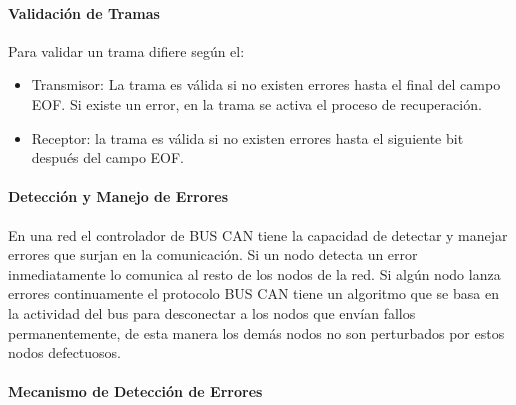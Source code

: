 \paragraph{Validación de Tramas}

Para validar un trama difiere según el:

\begin {itemize}
\item Transmisor: La trama es válida si no existen errores hasta el final del campo EOF. Si existe un error, en la trama se activa el proceso de recuperación.
\item Receptor: la trama es válida si no existen errores hasta el siguiente bit después del campo EOF.
\end{itemize}


\paragraph{Detección y Manejo de Errores}

En una red el controlador de BUS CAN tiene la capacidad de detectar y manejar errores que surjan en la comunicación. Si un nodo detecta un error inmediatamente lo comunica al resto de  los nodos de la red. Si algún nodo lanza errores continuamente el protocolo BUS CAN tiene un algoritmo que se basa en la actividad del bus para desconectar a los nodos que envían fallos permanentemente, de esta manera los demás nodos no son perturbados por estos nodos defectuosos.

\paragraph{Mecanismo de Detección de Errores}


